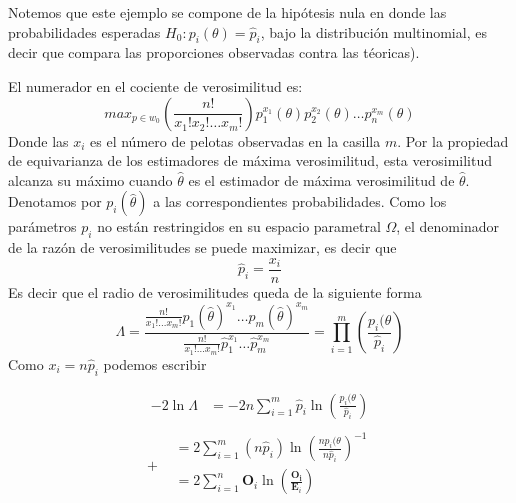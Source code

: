 \documentclass[peerreview]{IEEEtran}
\begin{document}
Notemos que este ejemplo se compone de la hipótesis nula en donde las probabilidades esperadas $H_0: p_i(\theta) = \hat{p}_i$, bajo la distribución multinomial, es decir que compara las proporciones observadas contra las téoricas).

El numerador en el cociente de verosimilitud es:
\[
max_{p\in w_0} \left( \frac{n!}{x_1!x_2!\dots x_m!} \right)p_1^{x_1}(\theta)p_2^{x_2}(\theta)\dots p_n^{x_m}(\theta)
\] 
Donde las $x_i$ es el número de pelotas observadas en la casilla $m$. Por la propiedad de equivarianza de los estimadores de máxima verosimilitud, esta verosimilitud alcanza su máximo cuando $\hat{\theta}$ es el estimador de máxima verosimilitud de $\hat{\theta}$. Denotamos por $p_i(\hat{\theta})$ a las correspondientes probabilidades.  
Como los parámetros $p_i$ no están restringidos en su espacio parametral $\Omega$, el denominador de la razón de verosimilitudes se puede maximizar, es decir que 
\[
	\hat{p}_i = \frac{x_i}{n}
\]
Es decir que el radio de verosimilitudes queda de la siguiente forma 
\[ 
\Lambda = \frac{   \frac{n!}{x_1!\dots x_m!}  p_1(\hat{\theta})^{x_1}  \dots p_m(\hat{\theta})^{x_m} }  {\frac{n!}{x_1!\dots x_m!} \hat{p}_1^{x_1} \dots \hat{p}_m^{x_m}} = \prod_{i=1}^m\left( \frac{p_i(\theta}{\hat{p}_i}\right)
\]
Como $x_i = n \hat{p}_i$ podemos escribir

\begin{equation}\label{A1}
\begin{split}
-2\ln \Lambda & =-2n\sum_{i=1}^m\hat{p}_i \ln \left( \frac{p_i(\theta}{\hat{p}_i}\right) \\
\end{split}
\end{equation}
\begin{equation*}+
\begin{split}
& =2\sum_{i=1}^m(n\hat{p}_i) \ln \left( \frac{np_i(\theta}{n\hat{p}_i}\right)^{-1} \\
& =2\sum_{i=1}^n\mathbf{O}_i\ln \left( \frac{\mathbf{O_i}}{\mathbf{E}_i} \right)\\
\end{split}
\end{equation*}
\end{document}
